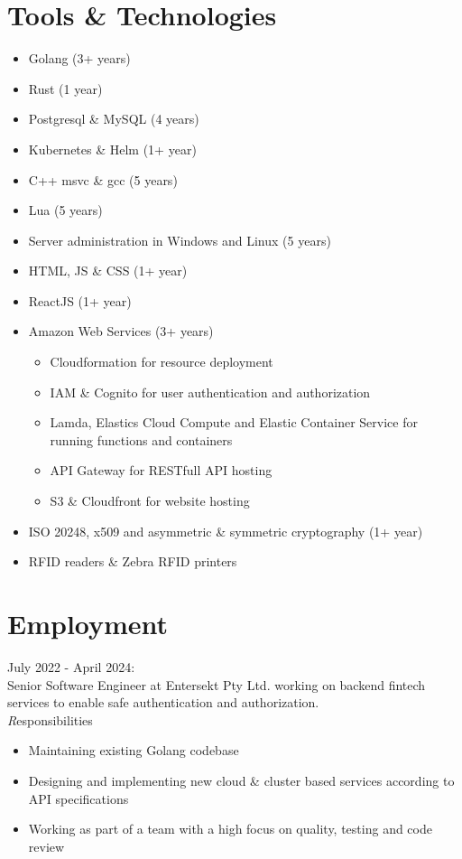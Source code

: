\documentclass[11pt,a4paper]{article}
\begin{document}
\section*{Tools \& Technologies}
\begin{itemize}
	\item Golang (3+ years)
	\item Rust (1 year)
	\item Postgresql \& MySQL  (4 years)
	\item Kubernetes \& Helm (1+ year)
	\item C++ msvc \& gcc (5 years)
	\item Lua (5 years)
	\item Server administration in Windows and Linux (5 years)
	\item HTML, JS \& CSS (1+ year)
	\item ReactJS (1+ year)
	\item Amazon Web Services (3+ years)
	\begin{itemize}
		\item Cloudformation for resource deployment
		\item IAM \& Cognito for user authentication and authorization
		\item Lamda, Elastics Cloud Compute and Elastic Container Service for running functions and containers
		\item API Gateway for RESTfull API hosting
		\item S3 \& Cloudfront for website hosting 
	\end{itemize}
	\item ISO 20248, x509 and asymmetric \& symmetric cryptography (1+ year)
	\item RFID readers \& Zebra RFID printers
\end{itemize}

\section*{Employment}        
   
{\noindent\large July 2022 - April 2024:}\\
Senior Software Engineer at Entersekt Pty Ltd. working on backend fintech services to enable safe authentication and authorization.
\\

	{\emph Responsibilities}
	\begin{itemize}
		\item   Maintaining existing Golang codebase
		\item   Designing and implementing new cloud \& cluster based services according to API specifications
		\item   Working as part of a team with a high focus on quality, testing and code review  
	\end{itemize}
     
\end{document}

